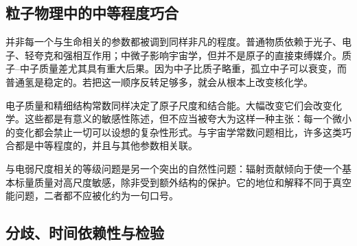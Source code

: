 \begin{classroomqa}
\end{classroomqa}

\subsection{粒子物理中的中等程度巧合}

并非每一个与生命相关的参数都被调到同样非凡的程度。普通物质依赖于光子、电子、轻夸克和强相互作用；中微子影响宇宙学，但并不是原子的直接束缚媒介。质子--中子质量差尤其具有重大后果。因为中子比质子略重，孤立中子可以衰变，而普通氢是稳定的。若把这一顺序反转足够多，就会从根本上改变核化学。

电子质量和精细结构常数同样决定了原子尺度和结合能。大幅改变它们会改变化学。这些都是有意义的敏感性陈述，但不应当被夸大为这样一种主张：每一个微小的变化都会禁止一切可以设想的复杂性形式。与宇宙学常数问题相比，许多这类巧合都是中等程度的，并且与其他参数相关联。

与电弱尺度相关的等级问题是另一个突出的自然性问题：辐射贡献倾向于使一个基本标量质量对高尺度敏感，除非受到额外结构的保护。它的地位和解释不同于真空能问题，二者都不应被化约为一句口号。

\begin{classroomqa}
\end{classroomqa}

\begin{classroomqa}
\end{classroomqa}

\subsection{分歧、时间依赖性与检验}

